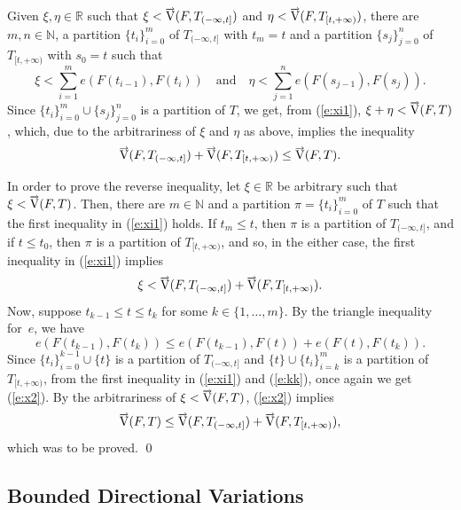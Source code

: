 \documentclass[preprint,12pt]{elsarticle}
\newcommand{\eq}[1]{\mbox{\rm(\ref{#1})}}
\newcommand{\Rb}{\mathbb{R}}  \newcommand{\Nb}{\mathbb{N}}
\newcommand{\riV}{{\scriptstyle\overrightarrow{\mbox{\rm V}}}}
\begin{document}
\begin{pfadd}
Given $\xi,\eta\in\Rb$ such that $\xi<\riV(F,T_{(-\infty,t]})$ and
$\eta<\riV(F,T_{[t,+\infty)})$, there are $m,n\in\Nb$, a partition $\{t_i\}_{i=0}^m$
of $T_{(-\infty,t]}$ with $t_m=t$ and a partition $\{s_j\}_{j=0}^n$ of $T_{[t,+\infty)}$
with $s_0=t$ such that
  \begin{equation} \label{e:xi1}
\xi<\sum_{i=1}^m e(F(t_{i-1}),F(t_i))\quad\mbox{and}\quad
\eta<\sum_{j=1}^n e(F(s_{j-1}),F(s_j)).
  \end{equation}
Since $\{t_i\}_{i=0}^m\cup\{s_j\}_{j=0}^n$ is a partition of $T$, we get, from \eq{e:xi1},
$\xi+\eta<\riV(F,T)$, which, due to the arbitrariness of $\xi$ and $\eta$ as above,
implies the inequality
  \begin{equation*}
\riV(F,T_{(-\infty,t]})+\riV(F,T_{[t,+\infty)})\le\riV(F,T).
  \end{equation*}

In order to prove the reverse inequality, let $\xi\in\Rb$ be arbitrary such that
$\xi<\riV(F,T)$. Then, there are $m\in\Nb$ and a partition $\pi=\{t_i\}_{i=0}^m$
of $T$ such that the first inequality in \eq{e:xi1} holds. If $t_m\le t$, then $\pi$ is a
partition of $T_{(-\infty,t]}$, and if $t\le t_0$, then $\pi$ is a partition of $T_{[t,+\infty)}$,
and so, in the either case, the first inequality in \eq{e:xi1} implies
  \begin{equation} \label{e:x2}
\xi<\riV(F,T_{(-\infty,t]})+\riV(F,T_{[t,+\infty)}).
  \end{equation}
Now, suppose $t_{k-1}\le t\le t_k$ for some $k\in\{1,\dots,m\}$. By the triangle
inequality for~$e$, we have
  \begin{equation} \label{e:kk}
e(F(t_{k-1}),F(t_k))\le e(F(t_{k-1}),F(t))+e(F(t),F(t_k)).
  \end{equation}
Since $\{t_i\}_{i=0}^{k-1}\cup\{t\}$ is a partition of $T_{(-\infty,t]}$ and
$\{t\}\cup\{t_i\}_{i=k}^m$ is a partition of $T_{[t,+\infty)}$, from the first inequality
in \eq{e:xi1} and \eq{e:kk}, once again we get \eq{e:x2}. By the arbitrariness
 of $\xi<\riV(F,T)$,
\eq{e:x2} implies
   \begin{equation*}
\riV(F,T)\le\riV(F,T_{(-\infty,t]})+\riV(F,T_{[t,+\infty)}),
  \end{equation*}
 which was to be proved.
\qed\end{pfadd}

\subsection{Bounded Directional Variations} \label{ss:bdv}
\end{document}
